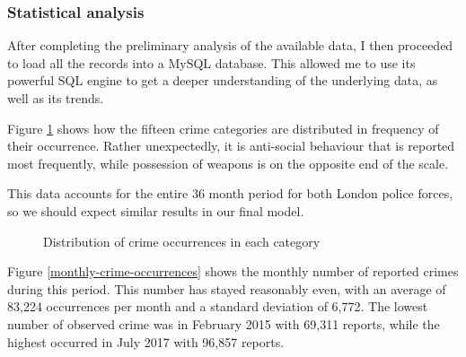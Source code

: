 \documentclass{article}
\begin{document}
	\subsubsection{Statistical analysis}

	After completing the preliminary analysis of the available data, I then proceeded to load all the records into a MySQL database. This allowed me to use its powerful SQL engine to get a deeper understanding of the underlying data, as well as its trends.

	Figure \ref{fig:crime-distribution} shows how the fifteen crime categories are distributed in frequency of their occurrence. Rather unexpectedly, it is anti-social behaviour that is reported most frequently, while possession of weapons is on the opposite end of the scale.

	This data accounts for the entire 36 month period for both London police forces, so we should expect similar results in our final model.

	\begin{figure}[H]
		\caption{Distribution of crime occurrences in each category}
		\label{fig:crime-distribution}
	\end{figure}

	Figure \ref{monthly-crime-occurrences} shows the monthly number of reported crimes during this period. This number has stayed reasonably even, with an average of 83,224 occurrences per month and a standard deviation of 6,772. The lowest number of observed crime was in February 2015 with 69,311 reports, while the highest occurred in July 2017 with 96,857 reports.
\end{document}
